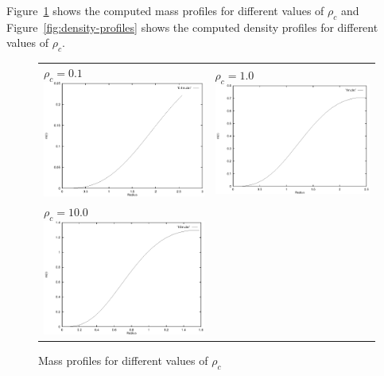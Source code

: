 \documentclass[a4paper]{IEEEtran}
\begin{document}
    Figure~\ref{fig:mass-profiles} shows the computed mass profiles for different values of 
    $\rho_c$ and Figure~\ref{fig:density-profiles} shows the computed density profiles
    for different values of $\rho_c$. 


    \begin{figure} 
    \caption{Mass profiles for different values of $\rho_c$} 
    \label{fig:mass-profiles} 
    \begin{center}
    \begin{tabular}{p{7cm}p{7cm}}  
        $\rho_c = 0.1$ \newline \includegraphics[width=7cm]{figures/0-1m.eps} & 
        $\rho_c = 1.0$ \newline \includegraphics[width=7cm]{figures/1m.eps}  
        \\
        $\rho_c = 10.0$ \newline \includegraphics[width=7cm]{figures/10m.eps}  & 

\end{tabular}
\end{center}
\end{figure}
\end{document}
